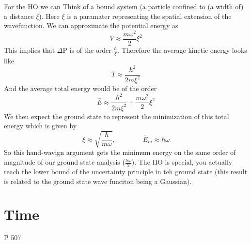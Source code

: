 \documentclass{article}
\newcommand{\be}{\begin{equation}}
\newcommand{\ee}{\end{equation}}
\begin{document}
For the HO we can Think of a bound system (a particle confined to (a width of) a distance $\xi$). 
Here $\xi$ is a paramater representing the spatial extension of the wavefunction. 
We can approximate the potential energy as 
\be
\bar{V} \approx \frac{m\omega^2}{2}\xi^2
\ee
This implies that $\Delta$P is of the order $\frac{\hbar}{\xi}$.
Therefore the average kinetic energy looks like
\be
\bar{T} \approx \frac{\hbar^2}{2m\xi^2}
\ee
And the average total energy would be of the order
\be
\bar{E} \approx \frac{\hbar^2}{2m\xi^2} + \frac{m\omega^2}{2}\xi^2
\ee
We then expect the ground state to represent the minimization of this total energy which is given by 
\be
\xi \approx \sqrt{\frac{\hbar}{m\omega}}, \qquad \qquad \bar{E}_m \approx \hbar \omega
\ee
So this hand-wavign argument gets the minimum energy on the same order of magnitude of our ground state analysis ($\frac{\hbar \omega}{2}$). 
The HO is special, you actually reach the lower bound of the uncertainty principle in teh ground state (this result is related to the ground state wave funciton being a  Gaussian). 

\section*{Time}
P 507
\end{document}
